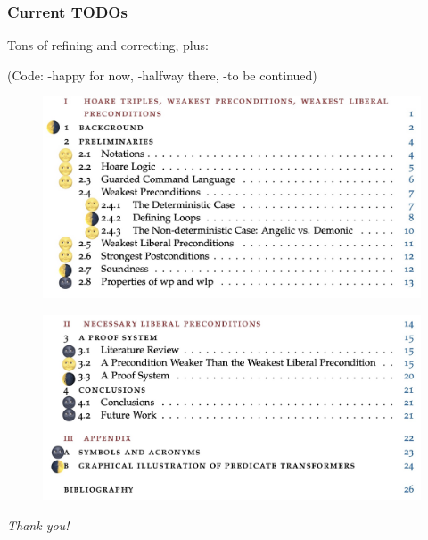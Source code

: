 \documentclass[aspectratio=169]{beamer}
\begin{document}
\begin{frame}
	\frametitle{Current TODOs}
	Tons of refining and correcting, plus: 
	
	\medskip
	(Code: -happy for now, -halfway there, -to be continued)

	\begin{minipage}[t]{0.49\linewidth}
		\begin{figure} 
		\centering\includegraphics[width=\textwidth]{images/progress1.jpg}
		\end{figure}
	\end{minipage}
	\begin{minipage}[t]{0.49\linewidth}
		\begin{figure} 
		\centering\includegraphics[width=\textwidth]{images/progress2.jpg}
		\end{figure}
	\end{minipage}

	\vspace{10mm}
	\Large
	\hfill\textit{Thank you!}
\end{frame}
\end{document}
